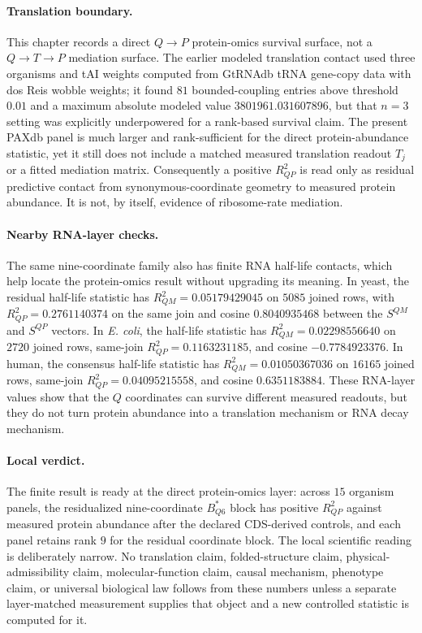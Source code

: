 \paragraph{Translation boundary.}
This chapter records a direct $Q \to P$ protein-omics survival surface, not a $Q \to T \to P$ mediation surface.  The earlier modeled translation contact used three organisms and tAI weights computed from GtRNAdb tRNA gene-copy data with dos Reis wobble weights; it found $81$ bounded-coupling entries above threshold $0.01$ and a maximum absolute modeled value $3801961.031607896$, but that $n=3$ setting was explicitly underpowered for a rank-based survival claim.  The present PAXdb panel is much larger and rank-sufficient for the direct protein-abundance statistic, yet it still does not include a matched measured translation readout $T_j$ or a fitted mediation matrix.  Consequently a positive $R^2_{QP}$ is read only as residual predictive contact from synonymous-coordinate geometry to measured protein abundance.  It is not, by itself, evidence of ribosome-rate mediation.

\paragraph{Nearby RNA-layer checks.}
The same nine-coordinate family also has finite RNA half-life contacts, which help locate the protein-omics result without upgrading its meaning.  In yeast, the residual half-life statistic has $R^2_{QM}=0.05179429045$ on $5085$ joined rows, with $R^2_{QP}=0.2761140374$ on the same join and cosine $0.8040935468$ between the $S^{QM}$ and $S^{QP}$ vectors.  In \emph{E. coli}, the half-life statistic has $R^2_{QM}=0.02298556640$ on $2720$ joined rows, same-join $R^2_{QP}=0.1163231185$, and cosine $-0.7784923376$.  In human, the consensus half-life statistic has $R^2_{QM}=0.01050367036$ on $16165$ joined rows, same-join $R^2_{QP}=0.04095215558$, and cosine $0.6351183884$.  These RNA-layer values show that the $Q$ coordinates can survive different measured readouts, but they do not turn protein abundance into a translation mechanism or RNA decay mechanism.

\paragraph{Local verdict.}
The finite result is ready at the direct protein-omics layer: across $15$ organism panels, the residualized nine-coordinate $B^{\ast}_{Q6}$ block has positive $R^2_{QP}$ against measured protein abundance after the declared CDS-derived controls, and each panel retains rank $9$ for the residual coordinate block.  The local scientific reading is deliberately narrow.  No translation claim, folded-structure claim, physical-admissibility claim, molecular-function claim, causal mechanism, phenotype claim, or universal biological law follows from these numbers unless a separate layer-matched measurement supplies that object and a new controlled statistic is computed for it.